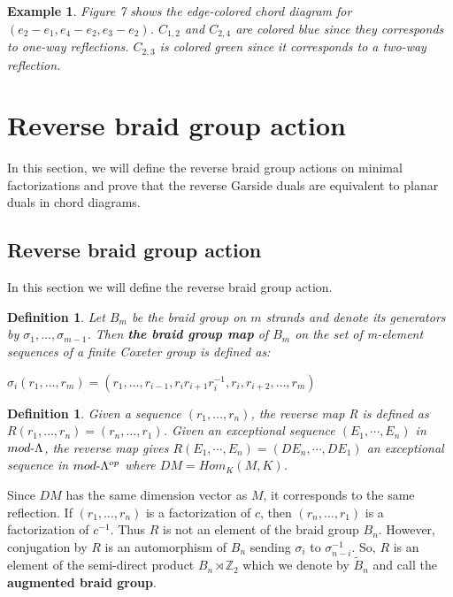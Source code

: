 \documentclass[11pt]{amsart}
\newtheorem{defi}[thm]{Definition}%
\newtheorem{exa}[thm]{Example}%
\begin{document}
\begin{exa}
    Figure 7 shows the edge-colored chord diagram for $(e_2-e_1,e_4-e_2,e_3-e_2)$. $C_{1,2}$ and $C_{2,4}$ are colored blue since they corresponds to one-way reflections. $C_{2,3}$ is colored green since it corresponds to a two-way reflection.
\end{exa}

\section{Reverse braid group action}
In this section, we will define the reverse braid group actions on minimal factorizations and prove that the reverse Garside duals are equivalent to planar duals in chord diagrams.

\subsection{Reverse braid group action}
In this section we will define the reverse braid group action.

\begin{defi}
    Let $B_m$ be the braid group on $m$ strands and denote its generators by $\sigma_1,\dots,\sigma_{m-1}$. Then \textbf{the braid group map} of $B_m$ on the set of m-element sequences of a finite Coxeter group is defined as:

    $\sigma_i(r_1,\dots,r_m)=(r_1,\dots,r_{i-1},r_ir_{i+1}r_i^{-1},r_i,r_{i+2},\dots,r_m)$
\end{defi}

\begin{defi}
    Given a sequence $(r_1,\dots,r_n)$, the reverse map R is defined as $R(r_1,\dots,r_n)=(r_n,\dots,r_1)$. Given an exceptional sequence $(E_1,\cdots,E_n)$ in $mod\text-\Lambda$, the reverse map gives $R(E_1,\cdots,E_n)=(DE_n,\cdots,DE_1)$ an exceptional sequence in $mod\text-\Lambda^{op}$ where $DM=Hom_K(M,K)$.
\end{defi}

Since $DM$ has the same dimension vector as $M$, it corresponds to the same reflection.
If $(r_1,\dots,r_n)$ is a factorization of $c$, then $(r_n,\dots,r_1)$ is a factorization of $c^{-1}$. Thus $R$ is not an element of the braid group $B_n$. However, conjugation by $R$ is an automorphism of $B_n$ sending $\sigma_i$ to $\sigma_{n-i}^{-1}$. So, $R$ is an element of the semi-direct product $B_n\rtimes \mathbb Z_2$ which we denote by $\widetilde B_n$ and call the \textbf{augmented braid group}.
\end{document}
